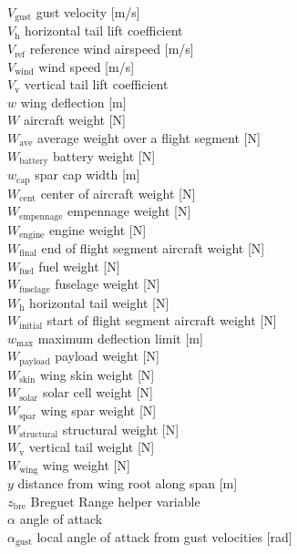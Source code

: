 \documentclass[]{aiaa-tc}%
\begin{document}
\begin{multicols}{2}
\begin{tabbing}
$V_{\text{gust}}$ \>  gust velocity [m/s] \\
$V_{\text{h}}$ \> horizontal tail lift coefficient \\
$V_{\text{ref}}$ \>  reference wind airspeed [m/s] \\
$V_{\text{wind}}$ \>  wind speed [m/s] \\
$V_{\text{v}}$ \> vertical tail lift coefficient \\
$w$ \> wing deflection [m] \\
$W$ \> aircraft weight [N] \\
$W_{\text{ave}}$ \> average weight over a flight segment [N] \\
$W_{\text{battery}}$ \> battery weight [N] \\
$w_{\text{cap}}$ \> spar cap width [m] \\
$W_{\text{cent}}$ \> center of aircraft weight [N] \\
$W_{\text{empennage}}$ \> empennage weight [N] \\
$W_{\text{engine}}$ \> engine weight [N] \\
$W_{\text{final}}$ \> end of flight segment aircraft weight [N] \\
$W_{\text{fuel}}$ \> fuel weight [N] \\
$W_{\text{fuselage}}$ \> fuselage weight [N] \\
$W_{\text{h}}$ \> horizontal tail weight [N] \\
$W_{\text{initial}}$ \> start of flight segment aircraft weight [N] \\
$w_{\text{max}}$ \> maximum deflection limit [m] \\
$W_{\text{payload}}$ \> payload weight [N] \\
$W_{\text{skin}}$ \> wing skin weight [N] \\
$W_{\text{solar}}$ \> solar cell weight [N] \\
$W_{\text{spar}}$ \> wing spar weight [N] \\
$W_{\text{structural}}$ \> structural weight [N] \\
$W_{\text{v}}$ \> vertical tail weight [N] \\
$W_{\text{wing}}$ \> wing weight [N] \\
$y$ \> distance from wing root along span [m] \\
$z_{\text{bre}}$ \> Breguet Range helper variable \\
$\alpha$ \> angle of attack \\
$\alpha_{\text{gust}}$ \> local angle of attack from gust velocities [rad] \\

\end{tabbing}
\end{multicols}
\end{document}
